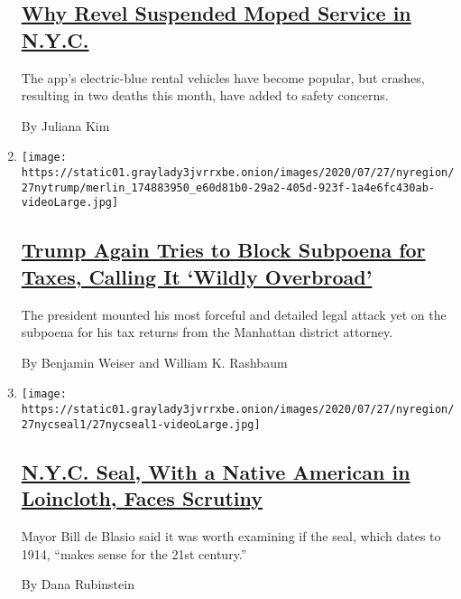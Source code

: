 \begin{enumerate}
  \hypertarget{why-revel-suspended-moped-service-in-nyc}{%
  \subsection{\texorpdfstring{\href{/2020/07/29/nyregion/revel-mopeds-nyc.html}{Why
  Revel Suspended Moped Service in
  N.Y.C.}}{Why Revel Suspended Moped Service in N.Y.C.}}\label{why-revel-suspended-moped-service-in-nyc}}

  The app's electric-blue rental vehicles have become popular, but
  crashes, resulting in two deaths this month, have added to safety
  concerns.

  By Juliana Kim
\item
  \texttt{[image: https://static01.graylady3jvrrxbe.onion/images/2020/07/27/nyregion/27nytrump/merlin\_174883950\_e60d81b0-29a2-405d-923f-1a4e6fc430ab-videoLarge.jpg]}

  \hypertarget{trump-again-tries-to-block-subpoena-for-taxes-calling-it-wildly-overbroad}{%
  \subsection{\texorpdfstring{\href{/2020/07/27/nyregion/donald-trump-taxes-cyrus-vance.html}{Trump
  Again Tries to Block Subpoena for Taxes, Calling It `Wildly
  Overbroad'}}{Trump Again Tries to Block Subpoena for Taxes, Calling It `Wildly Overbroad'}}\label{trump-again-tries-to-block-subpoena-for-taxes-calling-it-wildly-overbroad}}

  The president mounted his most forceful and detailed legal attack yet
  on the subpoena for his tax returns from the Manhattan district
  attorney.

  By Benjamin Weiser and William K. Rashbaum
\item
  \texttt{[image: https://static01.graylady3jvrrxbe.onion/images/2020/07/27/nyregion/27nycseal1/27nycseal1-videoLarge.jpg]}

  \hypertarget{nyc-seal-with-a-native-american-in-loincloth-faces-scrutiny}{%
  \subsection{\texorpdfstring{\href{/2020/07/27/nyregion/seal-nyc-native-american.html}{N.Y.C.
  Seal, With a Native American in Loincloth, Faces
  Scrutiny}}{N.Y.C. Seal, With a Native American in Loincloth, Faces Scrutiny}}\label{nyc-seal-with-a-native-american-in-loincloth-faces-scrutiny}}

  Mayor Bill de Blasio said it was worth examining if the seal, which
  dates to 1914, ``makes sense for the 21st century.''

  By Dana Rubinstein
\end{enumerate}


